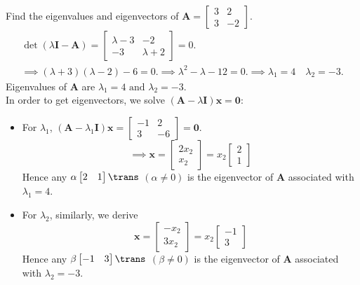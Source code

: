 \begin{example}
Find the eigenvalues and eigenvectors of $\bm A=\begin{bmatrix}
3&2\\3&-2
\end{bmatrix}$.\\
\begin{gather*}
\det(\lambda\bm I-\bm A)=\begin{bmatrix}
\lambda -3&-2\\-3&\lambda+2
\end{bmatrix}=0.\\
\implies (\lambda+3)(\lambda-2)-6=0.
\implies \lambda^2-\lambda-12=0.\implies
\lambda_1=4\quad\lambda_2=-3.
\end{gather*}
Eigenvalues of $\bm A$ are $\lambda_1=4\text{ and }\lambda_2=-3.$\\
In order to get eigenvectors, we solve $(\bm A-\lambda\bm I)\bm x=\bm 0$:
\begin{itemize}
\item
For $\lambda_1$, $(\bm A-\lambda_1\bm I)\bm x=\begin{bmatrix}
-1&2\\3&-6
\end{bmatrix}=\bm 0$.
\[
\implies \bm x=\begin{bmatrix}
2x_2\\x_2
\end{bmatrix}=x_2\begin{bmatrix}
2\\1
\end{bmatrix}
\]
Hence any $\alpha\begin{bmatrix}
2&1
\end{bmatrix}\trans$ $(\alpha\ne0)$ is the eigenvector of $\bm A$ associated with $\lambda_1=4.$
\item
For $\lambda_2$, similarly, we derive
\[
\bm x=\begin{bmatrix}
-x_2\\3x_2
\end{bmatrix}=x_2\begin{bmatrix}
-1\\3
\end{bmatrix}
\]
Hence any $\beta\begin{bmatrix}
-1&3
\end{bmatrix}\trans$ $(\beta\ne0)$ is the eigenvector of $\bm A$ associated with $\lambda_2=-3.$
\end{itemize}
\end{example}


